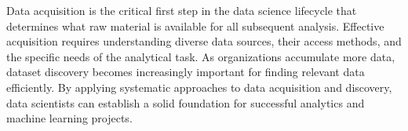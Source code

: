 \documentclass[12pt]{article}
\begin{document}
\begin{tcolorbox}[colback=red!5!white,colframe=red!75!black,title=Key Takeaway]
Data acquisition is the critical first step in the data science lifecycle that determines what raw material is available for all subsequent analysis. Effective acquisition requires understanding diverse data sources, their access methods, and the specific needs of the analytical task. As organizations accumulate more data, dataset discovery becomes increasingly important for finding relevant data efficiently. By applying systematic approaches to data acquisition and discovery, data scientists can establish a solid foundation for successful analytics and machine learning projects.
\end{tcolorbox}
\end{document}
